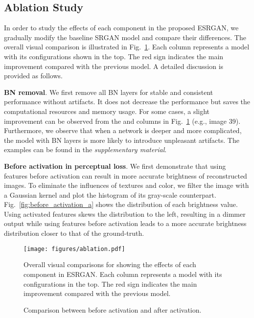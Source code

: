 \documentclass[runningheads]{llncs}
\begin{document}
\subsection{Ablation Study} \label{subsec:ablation_study}

In order to study the effects of each component in the proposed ESRGAN, we gradually modify the baseline SRGAN model 
and compare their differences. 
The overall visual comparison is illustrated in Fig.~\ref{fig:ablation}. Each column represents a model with its 
configurations shown in the top. The red sign indicates the main improvement compared with the previous model.
A detailed discussion is provided as follows.

\noindent \textbf{BN removal}.
We first remove all BN layers for stable and consistent performance without artifacts.
It does not decrease the performance but saves the computational resources and memory usage.
For some cases, a slight improvement can be observed from the  and  columns in Fig.~\ref{fig:ablation} 
(e.g., image 39).
Furthermore, we observe that when a network is deeper and more complicated, the model with BN layers is more likely  
to introduce unpleasant artifacts. The examples can be found in the \textit{supplementary material}.

\noindent \textbf{Before activation in perceptual loss}.
We first demonstrate that using features before activation can result in more accurate brightness of reconstructed 
images.
To eliminate the influences of textures and color, we filter the image with a Gaussian kernel and plot the 
histogram of its gray-scale counterpart. 
Fig.~\ref{fig:before_activation_a} shows the distribution of each brightness value.
Using activated features skews the distribution to the left, resulting in a dimmer output while using 
features before activation leads to a more accurate brightness distribution closer to that of the ground-truth.

\begin{figure}[htbp]
	\begin{center}
		\texttt{[image: figures/ablation.pdf]}
	\end{center}
	\vspace{-0.3cm}
	\caption{Overall visual comparisons for showing the effects of each component in ESRGAN. Each column represents a 
		model with its configurations in the top. The red sign indicates the main improvement compared with the 
		previous 
		model.}
	\label{fig:ablation}
	\vspace{-0.3cm}
\end{figure}
\begin{figure}[htbp]\centering
	\qquad
	\caption{Comparison between before activation and after activation.}\label{fig:before_activation}\vspace{-0.4cm}
\end{figure}
\end{document}
